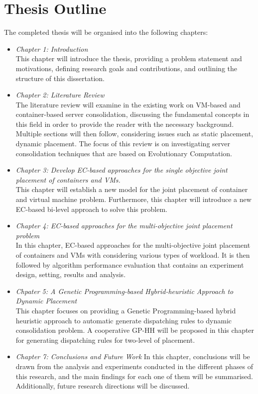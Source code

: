 \section{Thesis Outline}
The completed thesis will be organised into the following chapters:
\begin{itemize}
	\item \textit{Chapter 1: Introduction} \\
	This chapter will introduce the thesis, providing a problem statement and motivations, defining research goals and contributions, and outlining the structure of this dissertation.
	\item \textit{Chapter 2: Literature Review} \\
	The literature review will examine in the existing work on VM-based and container-based server consolidation, discussing the fundamental concepts in this field in order to provide the reader with the necessary background. Multiple sections will then follow, 
	considering issues such as static placement, dynamic placement. The focus of this review is on investigating server consolidation techniques that are based on Evolutionary Computation.
	\item \textit{Chapter 3: Develop EC-based approaches for the single objective joint placement of containers and VMs.} \\
	This chapter will establish a new model for the joint placement of container and virtual machine problem. Furthermore, this chapter will introduce a new EC-based bi-level approach to solve this problem. 
	\item \textit{Chapter 4: EC-based approaches for the multi-objective joint placement problem} \\
	In this chapter, EC-based approaches for the multi-objective joint placement of containers and VMs with considering various types of workload. It is then followed by algorithm performance evaluation that contains an experiment design, setting, results and analysis.
	\item \textit{Chpater 5: A Genetic Programming-based Hybrid-heuristic Approach to Dynamic Placement} \\
	This chapter focuses on providing a Genetic Programming-based hybrid heuristic approach to automatic generate dispatching rules to dynamic consolidation problem. A cooperative GP-HH will be proposed in this chapter for generating dispatching rules for two-level of placement.
	\item \textit{Chapter 7: Conclusions and Future Work}
	In this chapter, conclusions will be drawn from the analysis and experiments conducted in the different phases of this research, and the main findings for each one of them will be summarised. Additionally, future research directions will be discussed.

\end{itemize}


